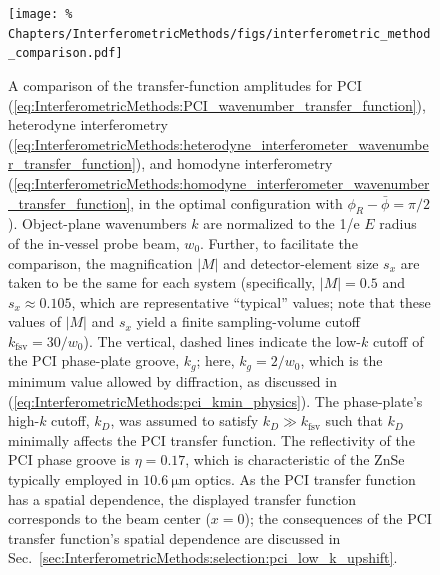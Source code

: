 \begin{figure}
  \centering
  \texttt{[image: \%
    Chapters/InterferometricMethods/figs/interferometric\_method\_comparison.pdf]}
  \caption[Comparison of interferometric method transfer functions]{%
    A comparison of the transfer-function amplitudes for
    PCI (\ref{eq:InterferometricMethods:PCI_wavenumber_transfer_function}),
    heterodyne interferometry
    (\ref{eq:InterferometricMethods:heterodyne_interferometer_wavenumber_transfer_function}),
    and homodyne interferometry
    (\ref{eq:InterferometricMethods:homodyne_interferometer_wavenumber_transfer_function},
    in the optimal configuration with $\phi_R - \bar{\phi} = \pi / 2$).
    Object-plane wavenumbers $k$ are normalized
    to the 1/e $E$ radius of the in-vessel probe beam, $w_0$.
    Further, to facilitate the comparison,
    the magnification $|M|$ and detector-element size $s_x$
    are taken to be the same for each system
    (specifically, $|M| = 0.5$ and $s_x \approx 0.105$,
    which are representative ``typical'' values;
    note that these values of $|M|$ and $s_x$
    yield a finite sampling-volume cutoff $k_{\text{fsv}} = 30 / w_0$).
    The vertical, dashed lines indicate
    the low-$k$ cutoff of the PCI phase-plate groove, $k_g$;
    here, $k_g = 2 / w_0$,
    which is the minimum value allowed by diffraction,
    as discussed in
    (\ref{eq:InterferometricMethods:pci_kmin_physics}).
    The phase-plate's high-$k$ cutoff, $k_D$, was assumed to satisfy
    $k_D \gg k_{\text{fsv}}$ such that
    $k_D$ minimally affects the PCI transfer function.
    The reflectivity of the PCI phase groove is $\eta = 0.17$,
    which is characteristic of the ZnSe typically
    employed in $\SI{10.6}{\micro\meter}$ optics.
    As the PCI transfer function has a spatial dependence,
    the displayed transfer function corresponds
    to the beam center ($x = 0$);
    the consequences of the PCI transfer function's spatial dependence
    are discussed in
    Sec.~\ref{sec:InterferometricMethods:selection:pci_low_k_upshift}.
  }
\label{fig:InterferometricMethods:interferometric_method_transfer_functions}
\end{figure}

